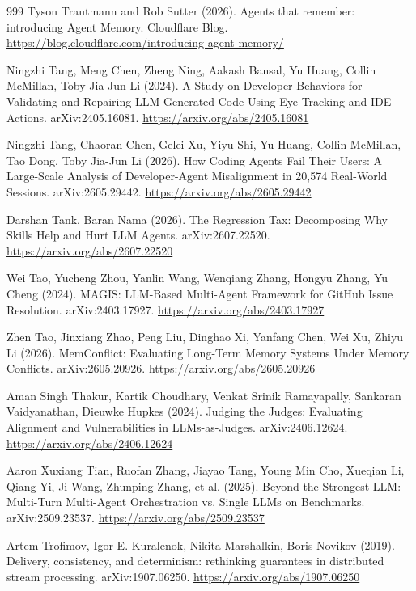 \begin{thebibliography}{999}
 Tyson Trautmann and Rob Sutter (2026). Agents that remember: introducing Agent Memory. Cloudflare Blog. \url{https://blog.cloudflare.com/introducing-agent-memory/}

 Ningzhi Tang, Meng Chen, Zheng Ning, Aakash Bansal, Yu Huang, Collin McMillan, Toby Jia-Jun Li (2024). A Study on Developer Behaviors for Validating and Repairing LLM-Generated Code Using Eye Tracking and IDE Actions. arXiv:2405.16081. \url{https://arxiv.org/abs/2405.16081}

 Ningzhi Tang, Chaoran Chen, Gelei Xu, Yiyu Shi, Yu Huang, Collin McMillan, Tao Dong, Toby Jia-Jun Li (2026). How Coding Agents Fail Their Users: A Large-Scale Analysis of Developer-Agent Misalignment in 20,574 Real-World Sessions. arXiv:2605.29442. \url{https://arxiv.org/abs/2605.29442}

 Darshan Tank, Baran Nama (2026). The Regression Tax: Decomposing Why Skills Help and Hurt LLM Agents. arXiv:2607.22520. \url{https://arxiv.org/abs/2607.22520}

 Wei Tao, Yucheng Zhou, Yanlin Wang, Wenqiang Zhang, Hongyu Zhang, Yu Cheng (2024). MAGIS: LLM-Based Multi-Agent Framework for GitHub Issue Resolution. arXiv:2403.17927. \url{https://arxiv.org/abs/2403.17927}

 Zhen Tao, Jinxiang Zhao, Peng Liu, Dinghao Xi, Yanfang Chen, Wei Xu, Zhiyu Li (2026). MemConflict: Evaluating Long-Term Memory Systems Under Memory Conflicts. arXiv:2605.20926. \url{https://arxiv.org/abs/2605.20926}

 Aman Singh Thakur, Kartik Choudhary, Venkat Srinik Ramayapally, Sankaran Vaidyanathan, Dieuwke Hupkes (2024). Judging the Judges: Evaluating Alignment and Vulnerabilities in LLMs-as-Judges. arXiv:2406.12624. \url{https://arxiv.org/abs/2406.12624}

 Aaron Xuxiang Tian, Ruofan Zhang, Jiayao Tang, Young Min Cho, Xueqian Li, Qiang Yi, Ji Wang, Zhunping Zhang, et al. (2025). Beyond the Strongest LLM: Multi-Turn Multi-Agent Orchestration vs. Single LLMs on Benchmarks. arXiv:2509.23537. \url{https://arxiv.org/abs/2509.23537}

 Artem Trofimov, Igor E. Kuralenok, Nikita Marshalkin, Boris Novikov (2019). Delivery, consistency, and determinism: rethinking guarantees in distributed stream processing. arXiv:1907.06250. \url{https://arxiv.org/abs/1907.06250}


\end{thebibliography}
